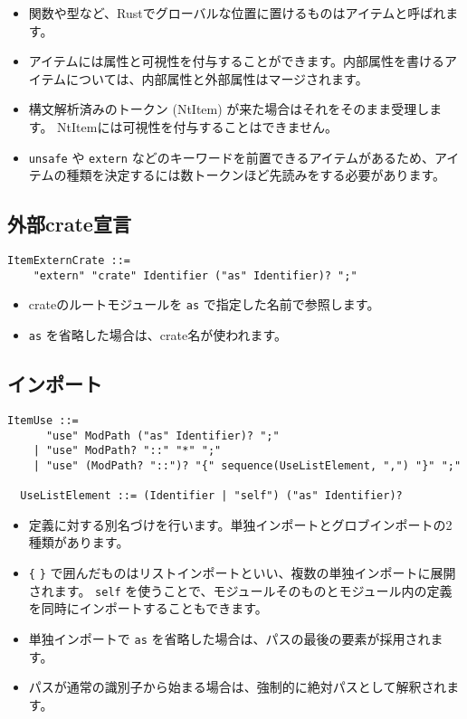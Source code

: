 \documentclass[dvipdfmx,uplatex,papersize,a4paper,10pt]{jsbook}
\theoremstyle{definition}
\begin{document}
\begin{itemize}
  \item 関数や型など、Rustでグローバルな位置に置けるものはアイテムと呼ばれます。
  \item アイテムには属性と可視性を付与することができます。内部属性を書けるアイテムについては、内部属性と外部属性はマージされます。
  \item 構文解析済みのトークン (NtItem) が来た場合はそれをそのまま受理します。 NtItemには可視性を付与することはできません。
  \item \verb|unsafe| や \verb|extern| などのキーワードを前置できるアイテムがあるため、アイテムの種類を決定するには数トークンほど先読みをする必要があります。
\end{itemize}

\subsection{外部crate宣言}

\begin{lstlisting}[language=BNFLike, gobble=2]
  ItemExternCrate ::=
    "extern" "crate" Identifier ("as" Identifier)? ";"
\end{lstlisting}

\begin{itemize}
  \item crateのルートモジュールを \verb|as| で指定した名前で参照します。
  \item \verb|as| を省略した場合は、crate名が使われます。
\end{itemize}

\subsection{インポート}

\begin{lstlisting}[language=BNFLike, gobble=2]
  ItemUse ::=
      "use" ModPath ("as" Identifier)? ";"
    | "use" ModPath? "::" "*" ";"
    | "use" (ModPath? "::")? "{" sequence(UseListElement, ",") "}" ";"

  UseListElement ::= (Identifier | "self") ("as" Identifier)?
\end{lstlisting}

\begin{itemize}
  \item 定義に対する別名づけを行います。単独インポートとグロブインポートの2種類があります。
  \item \verb|{| \verb|}| で囲んだものはリストインポートといい、複数の単独インポートに展開されます。 \verb|self| を使うことで、モジュールそのものとモジュール内の定義を同時にインポートすることもできます。
  \item 単独インポートで \verb|as| を省略した場合は、パスの最後の要素が採用されます。
  \item パスが通常の識別子から始まる場合は、強制的に絶対パスとして解釈されます。
\end{itemize}
\end{document}
